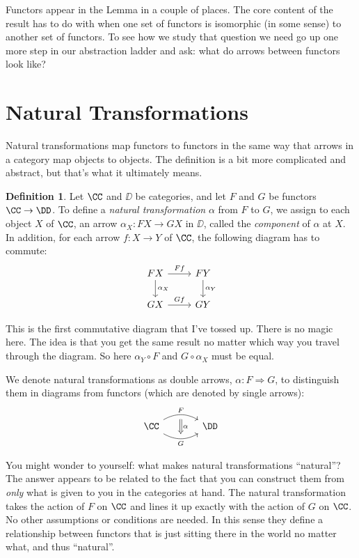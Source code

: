 \documentclass[12pt]{article}
\theoremstyle{definition}
\theoremstyle{definition}
\newtheorem{defn}{Definition}[]
\theoremstyle{definition}
\numberwithin{equation}{section}
\begin{document}
Functors appear in the Lemma in a couple of places. The core content of the result has to do with when one set of functors is isomorphic (in some sense) to another set of functors. To see how we study that question we need go up one more step in our abstraction ladder and ask: what do arrows between functors look like?

\section{Natural Transformations}

Natural transformations map functors to functors in the same way that arrows in a category map objects to objects. The definition is a bit more complicated and abstract, but that's what it ultimately means.

\begin{defn}
 Let $\CC$ and $\DD$ be categories, and let $F$ and $G$ be functors $\CC \to \DD$. To define a \emph{natural transformation} $\alpha$ from $F$ to $G$, 
we assign to each object $X$ of $\CC$, an arrow $\alpha_X:FX\to GX$ in $\DD$, called the \emph{component} of $\alpha$ at $X$. In addition, for each arrow $f:X\to Y$ of $\CC$, the following diagram has to commute:
  $$
  \begin{tikzcd}
   FX \ar{r}{Ff} \ar{d}{\alpha_X} & FY \ar{d}{\alpha_{Y}} \\
   GX \ar{r}{Gf} & GY
  \end{tikzcd}
  $$
\end{defn}
\noindent
This is the first commutative diagram that I've tossed up. There is no magic here. The idea is that you get the same result no matter which way you travel through the diagram. So here $\alpha_Y \circ F$ and $G \circ \alpha_X$ must be equal.

We denote natural transformations as double arrows, $\alpha: F \Rightarrow G$, to distinguish them in diagrams from functors (which are denoted by single arrows):
 $$
 \begin{tikzcd}[column sep=large]
  \CC \ar[bend left,""{below,name=F}]{r}{F} \ar[bend right,""{above,name=G}]{r}[swap]{G} & \DD
  \ar[Rightarrow,from=F,to=G,"\alpha"]
 \end{tikzcd}
 $$

You might wonder to yourself: what makes natural transformations ``natural''? The answer appears to be related to the fact that you can construct them from {\it only} what is given to you in the categories at hand. The natural transformation takes the action of $F$ on $\CC$ and lines it up exactly with the action of $G$ on $\CC$. No other assumptions or conditions are needed. In this sense they define a relationship between functors that is just sitting there in the world no matter what, and thus ``natural''.
\end{document}
